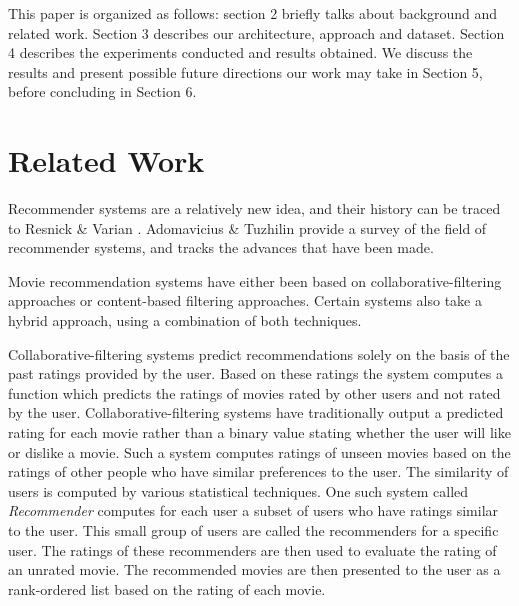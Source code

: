 \documentclass[conference]{IEEEtran}
\begin{document}
This paper is organized as follows: section 2 briefly talks about background and related work. Section 3 describes our architecture, approach and dataset. Section 4 describes the experiments conducted and results obtained. We discuss the results and present possible future directions our work may take in Section 5, before concluding in Section 6.  



\section{Related Work}
Recommender systems are a relatively new idea, and their history can be traced to Resnick \& Varian \cite{resnick1997recommender}. Adomavicius \& Tuzhilin \cite{adomavicius2005toward} provide a survey of the field of recommender systems, and tracks the advances that have been made. 

Movie recommendation systems have either been based on collaborative-filtering approaches or content-based filtering approaches. Certain systems also take a hybrid approach, using a combination of both techniques. 

Collaborative-filtering systems predict recommendations solely on the basis of the past ratings provided by the user. Based on these ratings the system computes a function which predicts the ratings of movies rated by other users and not rated by the user. Collaborative-filtering systems have traditionally output a predicted rating for each movie rather than a binary value stating whether the user will like or dislike a movie. Such a system computes ratings of unseen movies based on the ratings of other people who have similar preferences to the user. The similarity of users is computed by various statistical techniques. One such system called \textit{Recommender} \cite{basu1998recommendation} computes for each user a subset of users who have ratings similar to the user. This small group of users are called the recommenders for a specific user. The ratings of these recommenders are then used to evaluate the rating of an unrated movie. The recommended movies are then presented to the user as a rank-ordered list based on the rating of each movie.
\end{document}
